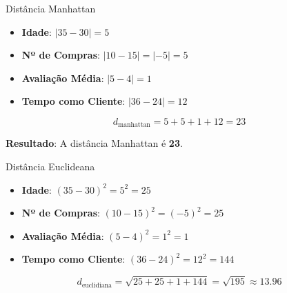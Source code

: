 \documentclass{beamer}
\begin{document}
\begin{frame}{Distância Manhattan}



\begin{itemize}
    \item \textbf{Idade}: $|35 - 30| = 5$
    \item \textbf{Nº de Compras}: $|10 - 15| = |-5| = 5$
    \item \textbf{Avaliação Média}: $|5 - 4| = 1$
    \item \textbf{Tempo como Cliente}: $|36 - 24| = 12$
\end{itemize}

\begin{equation}
d_{\text{manhattan}} = 5 + 5 + 1 + 12 = 23
\end{equation}

\textbf{Resultado}: A distância  Manhattan é \textbf{23}.
\end{frame}

\begin{frame}{Distância Euclideana}
\pause


\begin{itemize}
    \item \textbf{Idade}: ${(35 - 30)}^2 = 5^2 = 25$
    \item \textbf{Nº de Compras}: ${(10 - 15)}^2 = {(-5)}^2 = 25$
    \item \textbf{Avaliação Média}: ${(5 - 4)}^2 = 1^2 = 1$
    \item \textbf{Tempo como Cliente}: ${(36 - 24)}^2 = 12^2 = 144$
\end{itemize}
\pause
\begin{equation}
d_{\text{euclidiana}} = \sqrt{25 + 25 + 1 + 144} = \sqrt{195} \approx 13.96
\end{equation}

\end{frame}
\end{document}
